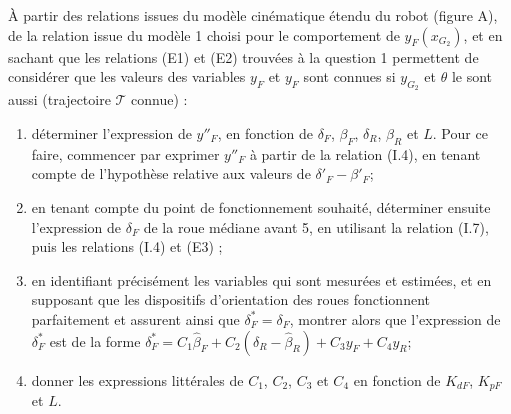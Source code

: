 \documentclass[11pt]{article}
\begin{document}
\UPSTIquestion À partir des relations issues du modèle cinématique étendu du robot (figure A), de la relation issue
du modèle 1 choisi pour le comportement de $y_F\left(x_{G_2}\right)$, et en sachant que les relations (E1) et (E2) trouvées à la question 1 permettent de considérer que les valeurs des variables $y_F$ et $y_F$ sont connues si $y_{G_2}$ et $\theta$ le sont aussi (trajectoire $\mathcal{T}$ connue) :
\begin{enumerate}
\item déterminer l’expression de $y''_F$, en fonction de $\delta_F$, $\beta_F$, $\delta_R$, $\beta_R$ et $L$. Pour ce faire, commencer par exprimer $y''_F$ à partir de la relation (I.4), en tenant compte de l’hypothèse relative aux valeurs de $\delta'_F-\beta'_F$;
\item en tenant compte du point de fonctionnement souhaité, déterminer ensuite l’expression de $\delta_F$ de la roue
médiane avant 5, en utilisant la relation (I.7), puis les relations (I.4) et (E3) ;
\item en identifiant précisément les variables qui sont mesurées et estimées, et en supposant que les dispositifs
d’orientation des roues fonctionnent parfaitement et assurent ainsi que $\delta^*_F = \delta_F$, montrer alors que l’expression de $\delta^*_F$ est de la forme $\delta^*_F =C_1 \hat{\beta}_F +C_2\left(\delta_R - \hat{\beta}_R\right)+C_3 y_F + C_4 y_R$;
\item donner les expressions littérales de $C_1$, $C_2$, $C_3$ et $C_4$ en fonction de $K_{dF}$, $K_{pF}$ et $L$.
\end{enumerate}
\end{document}
